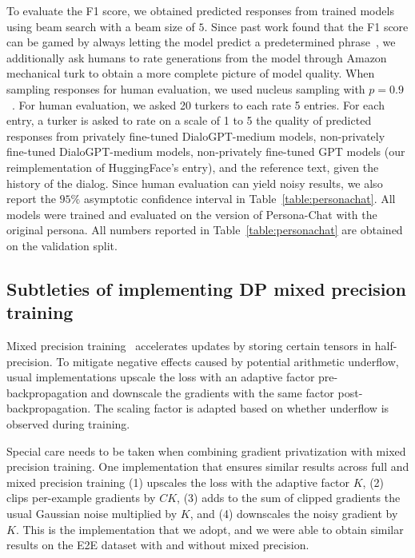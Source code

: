 To evaluate the F1 score, we obtained predicted responses from trained models using beam search with a beam size of $5$.
Since past work found that the F1 score can be gamed by always letting the model predict a predetermined phrase~\citep{dinan2019second}, we additionally ask humans to rate generations from the model through Amazon mechanical turk to obtain a more complete picture of model quality.
When sampling responses for human evaluation, we used nucleus sampling with $p=0.9$~\citep{holtzman2019curious}.
For human evaluation, we asked 20 turkers to each rate 5 entries.
For each entry, a turker is asked to rate on a scale of 1 to 5 the quality of predicted responses from privately fine-tuned DialoGPT-medium models, non-privately fine-tuned DialoGPT-medium models, non-privately fine-tuned GPT models (our reimplementation of HuggingFace's entry), and the reference text, given the history of the dialog. 
Since human evaluation can yield noisy results, we also report the $95\%$ asymptotic confidence interval in Table~\ref{table:personachat}.
All models were trained and evaluated on the version of Persona-Chat with the original persona.
All numbers reported in Table~\ref{table:personachat} are obtained on the validation split. 

\newpage
\subsection{Subtleties of implementing DP mixed precision training}
\label{app:mixed_precision}
Mixed precision training~\citep{micikevicius2017mixed} accelerates updates by storing certain tensors in half-precision.
To mitigate negative effects caused by potential arithmetic underflow, usual implementations upscale the loss with an adaptive factor pre-backpropagation and downscale the gradients with the same factor post-backpropagation. 
The scaling factor is adapted based on whether underflow is observed during training.

Special care needs to be taken when combining gradient privatization with mixed precision training.
One implementation that ensures similar results across full and mixed precision training 
(1) upscales the loss with the adaptive factor $K$, (2) clips per-example gradients by $C K$, (3) adds to the sum of clipped gradients the usual Gaussian noise multiplied by $K$, and (4) downscales the noisy gradient by $K$.
This is the implementation that we adopt, and we were able to obtain similar results on the E2E dataset with and without mixed precision. 


